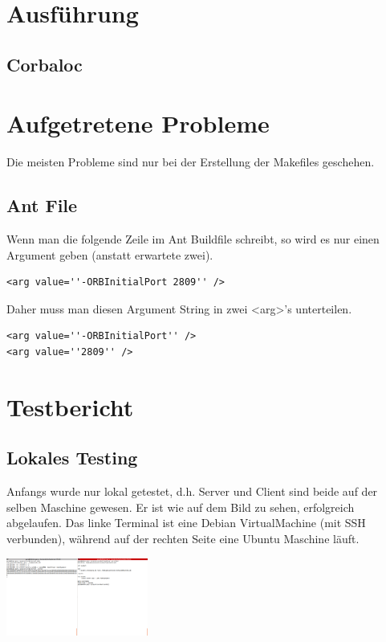 \documentclass[11pt]{article}
\begin{document}
\section{Ausführung}


\subsection{Corbaloc}
\cite{book1}

\section{Aufgetretene Probleme}
Die meisten Probleme sind nur bei der Erstellung der Makefiles geschehen.
\subsection{Ant File}

Wenn man die folgende Zeile im Ant Buildfile schreibt, so wird es nur einen Argument geben (anstatt erwartete zwei).
\begin{lstlisting}
<arg value=''-ORBInitialPort 2809'' />
\end{lstlisting}

Daher muss man diesen Argument String in zwei <arg>'s unterteilen.
\begin{lstlisting}
<arg value=''-ORBInitialPort'' />
<arg value=''2809'' />
\end{lstlisting}

\section{Testbericht}

\subsection{Lokales Testing}

Anfangs wurde nur lokal getestet, d.h. Server und Client sind beide auf der selben Maschine gewesen. Er ist wie auf dem Bild zu sehen, erfolgreich abgelaufen. Das linke Terminal ist eine Debian VirtualMachine (mit SSH verbunden), während auf der rechten Seite eine Ubuntu Maschine läuft.

\begin{center}
  \includegraphics[width=\linewidth, height=1in]{test_local}
\end{center}
\end{document}
